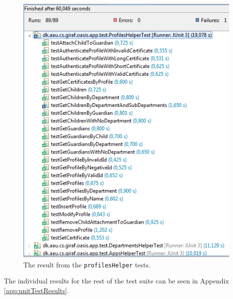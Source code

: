 \begin{figure}[htbp]
	\centering
		\includegraphics[width=\textwidth]{Images/unit_testing/profile_helper_tests.PNG}
	\caption{The result from the \texttt{profilesHelper} tests.}
	\label{fig:profile_helper_tests}
\end{figure}

The individual results for the rest of the test suite can be seen in Appendix \vref{app:unitTestResults}.